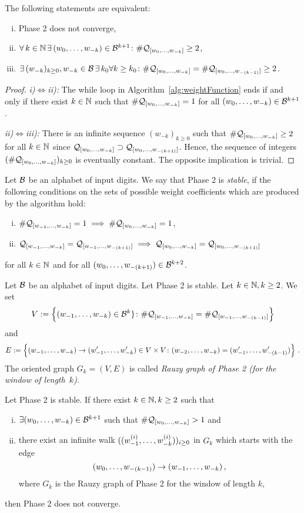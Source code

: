 \begin{lem}
The following statements are equivalent:
\begin{enumerate}[i)]
	\item Phase 2 does not converge,
	\item $\forall \,k\in \NN \,\exists\, \tupleo{k}\in\B^{k+1} \colon \#\Qwo{k}\geq 2$,
	\item $\exists \,(w_{-k})_{k\geq 0}, w_{-k}\in\B \,\exists\, k_0\forall k\geq k_0 \colon \#\Qwo{k}=\#\Qwo{(k-1)}\geq 2$.
\end{enumerate}
\begin{proof}
\textit{i)}$\iff$\textit{ii):} The while loop in Algorithm~\ref{alg:weightFunction} ends if and only if there exist $k\in\NN$ such that $\#\Qwo{k}=1$ for all $\tupleo{k}\in\B^{k+1}$.

\textit{ii)}$\iff$\textit{iii):} There is an infinite sequence $(w_{-k})_{k\geq 0}$ such that $\#\Qwo{k}\geq 2$ for all $k\in\NN$ since $\Qwo{k}\supset\Qwo{(k+1)}$. Hence, the sequence of integers $(\#\Qwo{k})_{k\geq 0}$ is eventually constant. The opposite implication is trivial.
\end{proof}
\end{lem}

\begin{defn}
Let $\B$ be an alphabet of input digits. We say that Phase 2 is \emph{stable}, if the following conditions on the sets of possible weight coefficients which are produced by the algorithm hold: 
\begin{enumerate}[i)]
	\item $\#\Qw{1}{k}=1 \implies \#\Qwo{k}=1$,
	\item $\Qw{1}{k}=\Qw{1}{(k+1)} \implies \Qwo{k}=\Qwo{(k+1)}$
\end{enumerate}
for all $k\in\NN$ and for all $\tupleo{(k+1)} \in \B^{k+2}$.
\end{defn}


\begin{defn}
Let $\B$ be an alphabet of input digits. Let Phase 2 is stable. Let $k\in\NN, k\geq 2$. We set
$$
V:=\left\{\tuple{1}{k}\in\B^k\} \colon \#\Qw{1}{k}=\#\Qw{1}{(k-1)}\right\}
$$
and
$$
E:=\left\{\tuple{1}{k}\rightarrow\tuple[w']{1}{k}\in V\times V \colon \tuple{2}{k}=\tuple[w']{1}{(k-1)}\right\}\,.
$$
The oriented graph $G_k=(V,E)$ is called \emph{Rauzy graph of Phase 2 (for the window of length~$k$)}.
\end{defn}

\begin{thm}
Let Phase 2 is stable. If there exist $k\in\NN, k\geq 2$ such that
\begin{enumerate}[i)]
	\item $\exists \tupleo{k}\in\B^{k+1}$ such that $\#\Qwo{k}>1$ and
	\item there exist an infinite walk $(\tuple[w^{(i)}]{1}{k})_{i\geq 0}$ in $G_k$ which starts with the edge $$\tupleo{(k-1)}\rightarrow\tuple{1}{k}\,,$$ where $G_k$ is the Rauzy graph of Phase 2 for the window of length $k$,
\end{enumerate}
then Phase 2 does not converge.
\end{thm}